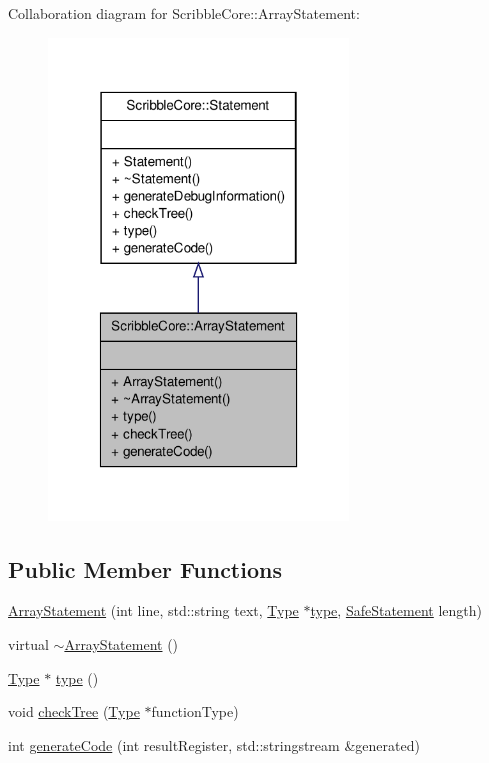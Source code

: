 Collaboration diagram for Scribble\-Core\-:\-:Array\-Statement\-:
\nopagebreak
\begin{figure}[H]
\begin{center}
\leavevmode
\includegraphics[width=226pt]{class_scribble_core_1_1_array_statement__coll__graph}
\end{center}
\end{figure}
\subsection*{Public Member Functions}
\begin{DoxyCompactItemize}
\item 
\hyperlink{class_scribble_core_1_1_array_statement_a0decfb9a7c6f44fd2715180caed7565c}{Array\-Statement} (int line, std\-::string text, \hyperlink{class_scribble_core_1_1_type}{Type} $\ast$\hyperlink{class_scribble_core_1_1_array_statement_a5b54b69993960b2dbaac9c49a25e6617}{type}, \hyperlink{namespace_scribble_core_a2ad5bf236bc9164cb56f564685f15a11}{Safe\-Statement} length)
\item 
virtual \hyperlink{class_scribble_core_1_1_array_statement_a737a24ca0c8806612e94ac037314eb5c}{$\sim$\-Array\-Statement} ()
\item 
\hyperlink{class_scribble_core_1_1_type}{Type} $\ast$ \hyperlink{class_scribble_core_1_1_array_statement_a5b54b69993960b2dbaac9c49a25e6617}{type} ()
\item 
void \hyperlink{class_scribble_core_1_1_array_statement_a4e4ea1be352a79a9749b057e67921c52}{check\-Tree} (\hyperlink{class_scribble_core_1_1_type}{Type} $\ast$function\-Type)
\item 
int \hyperlink{class_scribble_core_1_1_array_statement_aa5ac3da5af213e1c34092ab4a091a83e}{generate\-Code} (int result\-Register, std\-::stringstream \&generated)
\end{DoxyCompactItemize}


